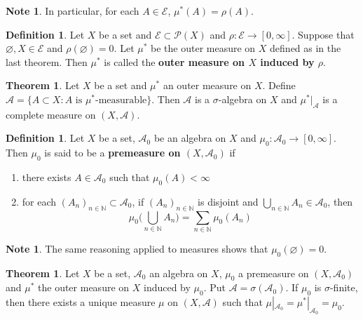 \documentclass{book}
\theoremstyle{definition}
\newtheorem{defn}[definition]{Definition}
\newtheorem{note}[definition]{Note}
\newtheorem{thm}[definition]{Theorem}
\newcommand{\sig}{\sigma}
\newcommand{\N}{\mathbb{N}}
\newcommand{\MA}{\mathcal{A}}
\newcommand{\ME}{\mathcal{E}}
\newcommand{\MP}{\mathcal{P}}
\newcommand{\ld}[1]{\label{defn:#1}}
\DeclareMathOperator*{\0}{\mbf{0}}
\DeclareMathOperator*{\1}{\mbf{1}}
\begin{document}
	\begin{note}
		In particular, for each $A \in \ME$, $\mu^*(A) = \rho(A)$.
	\end{note}
	
	\begin{defn} \ld{00000} 
		Let $X$ be a set and $\ME \subset \MP(X)$ and $\rho: \ME \rightarrow [0, \infty]$. Suppose that $\varnothing, X \in \ME$ and $\rho(\varnothing) = 0$. Let $\mu^*$ be the outer measure on $X$ defined as in the last theorem. Then $\mu^*$ is called the \textbf{outer measure on $X$ induced by $\rho$}.
	\end{defn}
	
	\begin{thm}
		Let $X$ be a set and $\mu^*$ an outer measure on $X$. Define $\MA = \{A \subset X: A \text{ is }\mu^*\text{-measurable}\}$. Then $\MA$ is a $\sig$-algebra on $X$ and $\mu^*|_{\MA}$ is a complete measure on $(X, \MA)$.
	\end{thm}
	
	\begin{defn} \ld{00000} 
		Let $X$ be a set, $\MA_0$ be an algebra on $X$ and $\mu_0:\MA_0 \rightarrow [0, \infty]$. Then $\mu_0$ is said to be a \textbf{premeasure on $(X,\MA_0)$} if 
		\begin{enumerate}
			\item there exists $A \in \MA_0$ such that $\mu_0(A)< \infty$
			\item for each $(A_n)_{n \in \N} \subset \MA_0$, if $(A_n)_{n \in \N}$ is disjoint and $\bigcup\limits_{n \in \N}A_n \in \MA_0$, then $$\mu_0 \bigg(\bigcup_{n\in \N}A_n \bigg) = \sum_{n \in \N}\mu_0(A_n)$$
		\end{enumerate}
	\end{defn}
	
	\begin{note}
		The same reasoning applied to measures shows that $\mu_0(\varnothing) = 0$.
	\end{note}
	
	\begin{thm}
		Let $X$ be a set, $\MA_0$ an algebra on $X$, $\mu_0$ a premeasure on $(X,\MA_0)$ and $\mu^*$ the outer measure on $X$ induced by $\mu_0$. Put $\MA = \sig(\MA_0)$. If $\mu_0$ is $\sig$-finite, then there exists a unique measure $\mu$ on $(X, \MA)$ such that $\mu|_{\MA_0} = \mu^*|_{\MA_0} = \mu_0$. 
	\end{thm}
	
	
	
	
	
	
	
\end{document}
